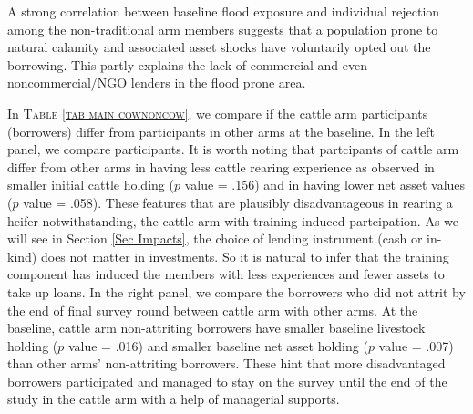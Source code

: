 	A strong correlation between baseline flood exposure and individual rejection among the non-\textsf{traditional} arm members suggests that a population prone to natural calamity and associated asset shocks have voluntarily opted out the borrowing. This partly explains the lack of commercial and even noncommercial/NGO lenders in the flood prone area. 
	
	In \textsc{\small Table \ref{tab main cownoncow}}, we compare if the \textsf{cattle} arm participants (borrowers) differ from participants in other arms at the baseline. In the left panel, we compare participants. It is worth noting that partcipants of \textsf{cattle} arm differ from other arms in having less cattle rearing experience as observed in smaller initial cattle holding ($p$ value = .156) and in having lower net asset values ($p$ value = .058). 
	These features that are plausibly disadvantageous in rearing a heifer notwithstanding, the \textsf{cattle} arm with training induced partcipation. As we will see in Section \ref{Sec Impacts}, the choice of lending instrument (cash or in-kind) does not matter in investments. So it is natural to infer that the training component has induced the members with less experiences and fewer assets to take up loans. In the right panel, we compare the borrowers who did not attrit by the end of final survey round between \textsf{cattle} arm with other arms. At the baseline, \textsf{cattle} arm non-attriting borrowers have smaller baseline livestock holding ($p$ value = .016) and smaller baseline net asset holding ($p$ value = .007) than other arms' non-attriting borrowers. %
	These hint that more disadvantaged borrowers participated and managed to stay on the survey until the end of the study in the \textsf{cattle} arm with a help of managerial supports.
	
